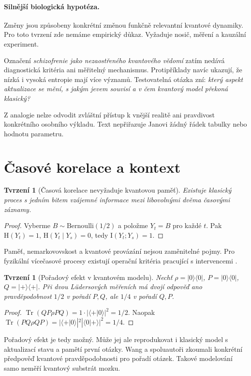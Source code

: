 \documentclass[11pt,a4paper]{article}
\newtheorem{proposition}[theorem]{Tvrzení}
\DeclareMathOperator{\Tr}{Tr}
\newcommand{\HH}{\mathrm H}
\newcommand{\II}{\mathrm I}
\begin{document}
\paragraph{Silnější biologická hypotéza.}
Změny jsou způsobeny konkrétní změnou funkčně relevantní kvantové dynamiky. Pro toto tvrzení zde nemáme empirický důkaz. Vyžaduje nosič, měření a kauzální experiment.

Označení \emph{schizofrenie jako nezaostřeného kvantového vědomí} zatím nedává diagnostická kritéria ani měřitelný mechanismus. Protipříklady navíc ukazují, že nízká i vysoká entropie mají více významů. Testovatelná otázka zní: \emph{který aspekt aktualizace se mění, s jakým jevem souvisí a v čem kvantový model překoná klasický?}

Z analogie nelze odvodit zvláštní přístup k vnější realitě ani pravdivost konkrétního osobního výkladu. Text nepřiřazuje Janovi žádný řádek tabulky nebo hodnotu parametru.

\newpage
\section{Časové korelace a kontext}
\begin{proposition}[Časová korelace nevyžaduje kvantovou paměť]
Existuje klasický proces s jedním bitem vzájemné informace mezi libovolnými dvěma časovými záznamy.
\end{proposition}
\begin{proof}
Vyberme $B\sim\mathrm{Bernoulli}(1/2)$ a položme $Y_t=B$ pro každé $t$.
Pak $\HH(Y_t)=1$, $\HH(Y_t\mid Y_s)=0$, tedy $\II(Y_t;Y_s)=1$.
\end{proof}
Paměť, nemarkovovskost a kvantové provázání nejsou zaměnitelné pojmy. Pro fyzikální vícečasové procesy existují operační kritéria pracující s intervencemi \cite{pollock}.

\begin{proposition}[Pořadový efekt v kvantovém modelu]
Nechť $\rho=|0\rangle\langle0|$, $P=|0\rangle\langle0|$,
$Q=|+\rangle\langle+|$. Při dvou Lüdersových měřeních má dvojí odpověď ano pravděpodobnost $1/2$ v pořadí $P,Q$, ale $1/4$ v pořadí $Q,P$.
\end{proposition}
\begin{proof}
$\Tr(QP\rho PQ)=1\cdot|\langle+|0\rangle|^2=1/2$.
Naopak $\Tr(PQ\rho QP)=|\langle+|0\rangle|^2|\langle0|+\rangle|^2=1/4$.
\end{proof}
Pořadový efekt je tedy možný. Může jej ale reprodukovat i klasický model s aktualizací stavu a pamětí první otázky. Wang a spoluautoři \cite{wang} zkoumali konkrétní předpověď kvantové pravděpodobnosti pro pořadí otázek. Takové modelování samo neměří kvantový substrát mozku.
\end{document}
